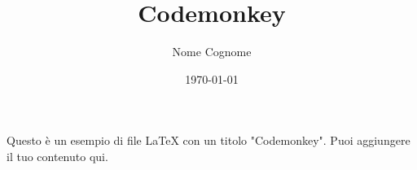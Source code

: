 \documentclass{article}
\title{Codemonkey}
\author{Nome Cognome}
\date{\today}
\begin{document}
\maketitle

Questo è un esempio di file LaTeX con un titolo "Codemonkey". Puoi aggiungere il tuo contenuto qui.
\end{document}
